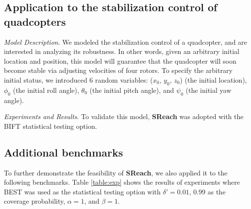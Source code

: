 \documentclass[runningheads,a4paper]{llncs}
\begin{document}
\subsection{Application to the stabilization control of quadcopters}

\textit{Model Description}.
We modeled the stabilization control of a quadcopter, and are interested in analyzing its robustness. In other words, given an arbitrary initial location and position, this model will guarantee that the quadcopter will soon become stable via adjusting velocities of four rotors. To specify the arbitrary initial status, we introduced 6 random variables: ($x_0$, $y_0$, $z_0$) (the initial location),  $\phi_0$ (the initial roll angle), $\theta_0$ (the initial pitch angle), and $\psi_0$ (the initial yaw angle).

\textit{Experiments and Results}. To validate this model, {\bf SReach} was adopted with the BIFT statistical testing option.  


\subsection{Additional benchmarks}
To further demonstrate the feasibility of {\bf SReach}, we also applied it to the following benchmarks. Table \ref{table:exp} shows the results of experiments where BEST was used as the statistical testing option with $\delta' = 0.01$, 0.99 as the coverage probability, $\alpha = 1$, and $\beta = 1$. 
\end{document}
